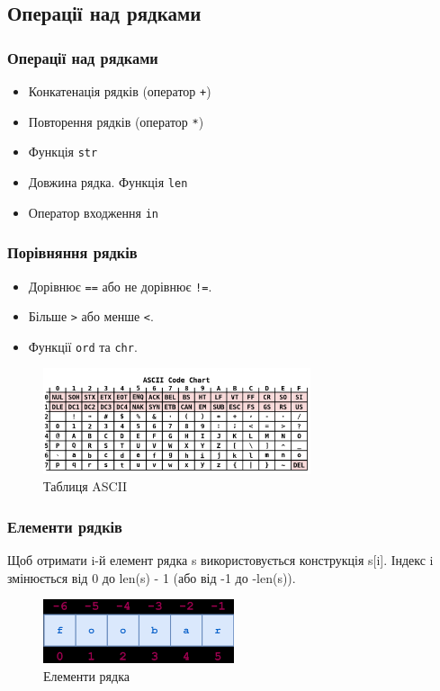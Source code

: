 \subsection{Операції над рядками} 
\begin{frame}
\frametitle{Операції над рядками}
\begin{itemize}
  \item Конкатенація рядків (оператор \texttt{+})
  \item Повторення рядків (оператор \texttt{*})
  \item Функція \texttt{str}
  \item Довжина рядка. Функція \texttt{len}
  \item Оператор входження \texttt{in}
 \end{itemize}

\end{frame}

\begin{frame}
\frametitle{Порівняння рядків}
\begin{itemize}
  \item Дорівнює \texttt{==} або не дорівнює \texttt{!=}.
  \item Більше \texttt{>} або менше \texttt{<}.
  \item Функції \texttt{ord} та \texttt{chr}.
\end{itemize}
\begin{figure}
\begin{center}
 \includegraphics[width=0.7\textwidth]{pictures/ASCII-Table.png}
\caption{Таблиця ASCII}
\label{ASCII-Table} 
\end{center}
\end{figure}
\end{frame}

\begin{frame}
\frametitle{Елементи рядків}
Щоб отримати  i-й елемент рядка s використовується конструкція s[i]. Індекс i змінюється від 0 до len(s) - 1 (або від -1 до -len(s)).
\begin{figure}
\begin{center}
 \includegraphics[width=0.5\textwidth]{pictures/string.png}
\caption{Елементи рядка}
\label{string} 
\end{center}
\end{figure}
\end{frame}

